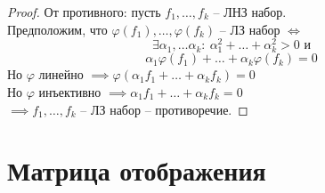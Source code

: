 \documentclass[11pt]{article}
\begin{document}
\begin{proof}
  От противного: пусть $f_1, \dots, f_k$ -- ЛНЗ набор. \\  
  Предположим, что $\varphi (f_1), \dots, \varphi (f_k)$ -- ЛЗ набор $\Longleftrightarrow$
  \[\exists \alpha_1, \dots \alpha_k: \ \alpha_1^2 + \dots + \alpha_k^2 > 0 \text{ и}\] 
  \[\alpha_1 \varphi(f_1) + \dots + \alpha_k \varphi(f_k) = 0\]
  Но $\varphi$ линейно $\implies \varphi (\alpha_1 f_1 + \dots + \alpha_k f_k) = 0$ \\
  Но $\varphi$ инъективно $\implies \alpha_1 f_1 + \dots + \alpha_k f_k = 0$ \\
  $\implies f_1, \dots, f_k$ -- ЛЗ набор -- противоречие.
\end{proof}

\section{Матрица отображения}
\end{document}
